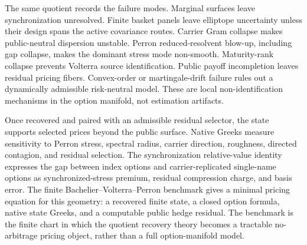 \documentclass[11pt,a4paper]{amsart}
\theoremstyle{plain}
\theoremstyle{definition}
\theoremstyle{remark}
\begin{document}
The same quotient records the failure modes.  Marginal surfaces leave synchronization unresolved.
Finite basket panels leave elliptope uncertainty unless their design spans the active covariance
routes.  Carrier Gram collapse makes public-neutral dispersion unstable.  Perron reduced-resolvent
blow-up, including gap collapse, makes the dominant stress mode non-smooth.  Maturity-rank
collapse prevents Volterra source identification.  Public payoff incompletion leaves residual
pricing fibers.  Convex-order or martingale-drift failure rules out a dynamically admissible
risk-neutral model.  These are local non-identification mechanisms in the option manifold, not
estimation artifacts.

Once recovered and paired with an admissible residual selector, the state supports selected prices
beyond the public surface.  Native Greeks measure sensitivity to Perron stress, spectral radius,
carrier direction, roughness, directed contagion, and residual selection.  The synchronization
relative-value identity expresses the gap between index options and carrier-replicated single-name
options as synchronized-stress premium, residual compression charge, and basis error.  The finite
Bachelier--Volterra--Perron benchmark gives a minimal pricing equation for this geometry: a
recovered finite state, a closed option formula, native state Greeks, and a computable public hedge
residual.  The benchmark is the finite chart in which the quotient recovery theory becomes a
tractable no-arbitrage pricing object, rather than a full option-manifold model.



\end{document}
